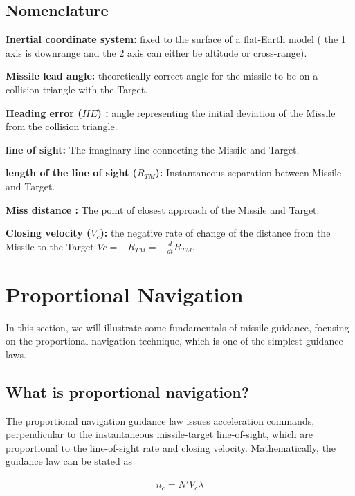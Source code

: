 \subsection*{Nomenclature}

\textbf{Inertial coordinate system:} fixed to the surface of a flat-Earth model ( the 1 axis is downrange and the 2 axis can either be altitude or cross-range).

\textbf{Missile lead angle:} theoretically correct angle
for the missile to be on a collision triangle with the Target.

\textbf{Heading error ($HE$) :} angle representing the initial deviation of the Missile from the collision triangle.

\textbf{line of sight:} The imaginary line connecting the Missile and Target.

\textbf{length of the line of sight ($R_{TM}$):} Instantaneous separation between Missile and Target.

\textbf{Miss distance :} The point of closest approach of the Missile and Target.

\textbf{Closing velocity ($V_c$):} the negative rate of change of the distance
from the Missile to the Target $Vc= -\dot{R_{TM}}=-\frac{d}{dt} R_{TM} $.




\section{Proportional Navigation}
In this section, we will illustrate some fundamentals of missile guidance, focusing on the proportional navigation technique, which is one of the simplest guidance laws.

\subsection*{What is proportional navigation?}
The proportional navigation guidance law issues acceleration commands,
perpendicular to the instantaneous missile-target line-of-sight, which are
proportional to the line-of-sight rate and closing velocity. Mathematically, the
guidance law can be stated as

\begin{equation}
	n_c= N' V_c \dot{\lambda}
	\label{PNeq}
\end{equation}

